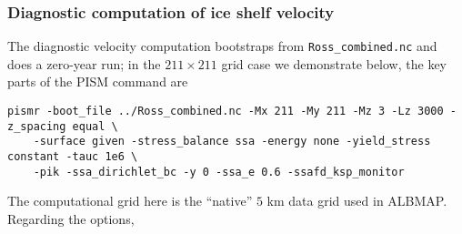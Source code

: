 \subsubsection*{Diagnostic computation of ice shelf velocity}  The diagnostic velocity computation bootstraps from \texttt{Ross_combined.nc} and does a zero-year run; in the $211\times 211$ grid case we demonstrate below, the key parts of the PISM command are

\begin{verbatim}
pismr -boot_file ../Ross_combined.nc -Mx 211 -My 211 -Mz 3 -Lz 3000 -z_spacing equal \
    -surface given -stress_balance ssa -energy none -yield_stress constant -tauc 1e6 \
    -pik -ssa_dirichlet_bc -y 0 -ssa_e 0.6 -ssafd_ksp_monitor
\end{verbatim}%

\noindent The computational grid here is the ``native'' $5$ km data grid used in ALBMAP.  Regarding the options,

